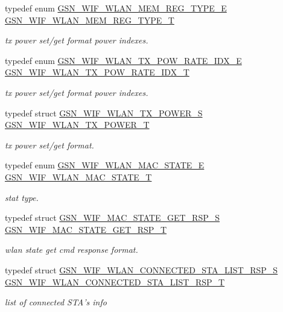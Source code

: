 \begin{DoxyCompactItemize}
typedef enum \hyperlink{a00677_ga7f657dfcb65c6810c23ae68bbca0b101}{GSN\_\-WIF\_\-WLAN\_\-MEM\_\-REG\_\-TYPE\_\-E} \hyperlink{a00677_gad221ad803b8f2c5c4e24ef1f0c0aa83c}{GSN\_\-WIF\_\-WLAN\_\-MEM\_\-REG\_\-TYPE\_\-T}
\begin{DoxyCompactList}\small\item\em tx power set/get format power indexes. \end{DoxyCompactList}\item 
typedef enum \hyperlink{a00677_ga75fc31972dc5127c4ee4b3e585ab0206}{GSN\_\-WIF\_\-WLAN\_\-TX\_\-POW\_\-RATE\_\-IDX\_\-E} \hyperlink{a00677_gaa864eedc8e384ed0ea49b62f267aff72}{GSN\_\-WIF\_\-WLAN\_\-TX\_\-POW\_\-RATE\_\-IDX\_\-T}
\begin{DoxyCompactList}\small\item\em tx power set/get format power indexes. \end{DoxyCompactList}\item 
typedef struct \hyperlink{a00408}{GSN\_\-WIF\_\-WLAN\_\-TX\_\-POWER\_\-S} \hyperlink{a00677_ga04f719a66b056bce000089417b9775bf}{GSN\_\-WIF\_\-WLAN\_\-TX\_\-POWER\_\-T}
\begin{DoxyCompactList}\small\item\em tx power set/get format. \end{DoxyCompactList}\item 
typedef enum \hyperlink{a00677_gaf26e714e09b57b3b2a5f21341613761d}{GSN\_\-WIF\_\-WLAN\_\-MAC\_\-STATE\_\-E} \hyperlink{a00677_gabb160daeefaad3c313cfd17480013311}{GSN\_\-WIF\_\-WLAN\_\-MAC\_\-STATE\_\-T}
\begin{DoxyCompactList}\small\item\em stat type. \end{DoxyCompactList}\item 
typedef struct \hyperlink{a00341}{GSN\_\-WIF\_\-MAC\_\-STATE\_\-GET\_\-RSP\_\-S} \hyperlink{a00677_ga6dbab71e19ca02665a3be40e8850b059}{GSN\_\-WIF\_\-MAC\_\-STATE\_\-GET\_\-RSP\_\-T}
\begin{DoxyCompactList}\small\item\em wlan state get cmd response format. \end{DoxyCompactList}\item 
typedef struct \hyperlink{a00375}{GSN\_\-WIF\_\-WLAN\_\-CONNECTED\_\-STA\_\-LIST\_\-RSP\_\-S} \hyperlink{a00677_ga0cb3a8c19998e8db9e9251598e564b23}{GSN\_\-WIF\_\-WLAN\_\-CONNECTED\_\-STA\_\-LIST\_\-RSP\_\-T}
\begin{DoxyCompactList}\small\item\em list of connected STA's info \end{DoxyCompactList}\item 

\end{DoxyCompactItemize}
